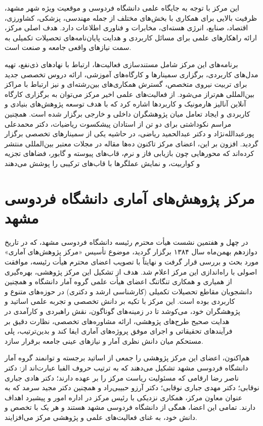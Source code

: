 \documentclass[
  letterpaper,
  DIV=11,
  numbers=noendperiod]{scrreprt}
\begin{document}
این مرکز با توجه به جایگاه علمی دانشگاه فردوسی و موقعیت ویژه شهر مشهد،
ظرفیت بالایی برای همکاری با بخش‌های مختلف از جمله مهندسی، پزشکی، کشاورزی،
اقتصاد، صنایع، انرژی هسته‌ای، مخابرات و فناوری اطلاعات دارد. هدف اصلی
مرکز، ارائه راهکارهای علمی برای مسائل کاربردی و هدایت پایان‌نامه‌های
تحصیلات تکمیلی به سمت نیازهای واقعی جامعه و صنعت است.

برنامه‌های این مرکز شامل مستندسازی فعالیت‌ها، ارتباط با نهادهای ذی‌نفع،
تهیه مدل‌های کاربردی، برگزاری سمینارها و کارگاه‌های آموزشی، ارائه دروس
تخصصی جدید برای تربیت نیروی متخصص، گسترش همکاری‌های بین‌رشته‌ای و نیز
ارتباط با مراکز بین‌المللی هم‌تراز می‌شود. از فعالیت‌های علمی اخیر مرکز
می‌توان به برگزاری کارگاه آنلاین آنالیز هارمونیک و کاربردها اشاره کرد که
با هدف توسعه پژوهش‌های بنیادی و کاربردی و ایجاد تعامل میان پژوهشگران
داخلی و خارجی برگزار شده است. همچنین مراسم نکوداشتی برای دو تن از
استادان پیشکسوت ریاضیات، دکتر محمدعلی پورعبدالله‌نژاد و دکتر عبدالحمید
ریاضی، در حاشیه یکی از سمینارهای تخصصی برگزار گردید. افزون بر این، اعضای
مرکز تاکنون ده‌ها مقاله در مجلات معتبر بین‌المللی منتشر کرده‌اند که
محورهایی چون بازیابی فاز و نرم، قاب‌های پیوسته و گابور، فضاهای تجزیه و
کواربیت، و نمایش عملگرها با قاب‌های ترکیبی را پوشش می‌دهند

\section{مرکز پژوهش‌های آماری دانشگاه فردوسی
مشهد}\label{ux645ux631ux6a9ux632-ux67eux698ux648ux647ux634ux647ux627ux6cc-ux622ux645ux627ux631ux6cc-ux62fux627ux646ux634ux6afux627ux647-ux641ux631ux62fux648ux633ux6cc-ux645ux634ux647ux62f}

در چهل و هفتمین نشست هیأت محترم رئیسه دانشگاه فردوسی مشهد، که در تاریخ
دوازدهم بهمن‌ماه سال ۱۳۸۴ برگزار گردید، موضوع تأسیس «مرکز پژوهش‌های آماری»
مورد بحث و بررسی قرار گرفت و نهایتاً با تصویب اعضای محترم هیأت رئیسه،
موافقت اصولی با راه‌اندازی این مرکز اعلام شد. هدف از تشکیل این مرکز
پژوهشی، بهره‌گیری از همیاری و همکاری تنگاتنگ اعضای هیأت علمی گروه آمار
دانشگاه و همچنین دانشجویان مقاطع تحصیلات تکمیلی (کارشناسی ارشد و دکتری)
در حوزه‌های متنوع و کاربردی بوده است. این مرکز با تکیه بر دانش تخصصی و
تجربه علمی اساتید و پژوهشگران خود، می‌کوشد تا در زمینه‌های گوناگون، نقش
راهبردی و کارآمدی در هدایت صحیح طرح‌های پژوهشی، ارائه مشاوره‌های تخصصی،
نظارت دقیق بر فرآیندهای تحقیقاتی و اجرای موفق پروژه‌های آماری ایفا کند و
بدین‌ترتیب، پلی مستحکم میان دانش نظری آمار و نیازهای عینی جامعه برقرار
سازد.

هم‌اکنون، اعضای این مرکز پژوهشی را جمعی از اساتید برجسته و توانمند گروه
آمار دانشگاه فردوسی مشهد تشکیل می‌دهند که به ترتیب حروف الفبا عبارت‌اند
از: دکتر ناصر رضا ارقامی که مسئولیت ریاست مرکز را بر عهده دارند؛ دکتر
هادی جباری نوقابی؛ دکتر مهدی جباری نوقابی؛ دکتر آرزو حبیبی‌راد و همچنین
دکتر مجید سرمد که به عنوان معاون مرکز، همکاری نزدیکی با رئیس مرکز در
اداره امور و پیشبرد اهداف دارند. تمامی این اعضا، همگی از دانشگاه فردوسی
مشهد هستند و هر یک با تخصص و دانش خود، به غنای فعالیت‌های علمی و پژوهشی
مرکز می‌افزایند.
\end{document}
